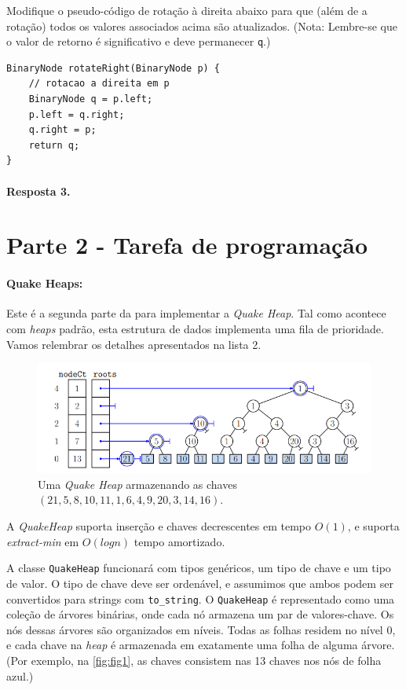 \documentclass{article}
\begin{document}
Modifique o pseudo-código de rotação à direita abaixo para que (além de
a rotação) todos os valores associados acima são atualizados. (Nota: Lembre-se que o
valor de retorno é significativo e deve permanecer \texttt{q}.)
\begin{lstlisting}
BinaryNode rotateRight(BinaryNode p) { 
    // rotacao a direita em p
    BinaryNode q = p.left;
    p.left = q.right;
    q.right = p;
    return q;
}
\end{lstlisting}

\paragraph{Resposta 3.}

\section*{Parte 2 - Tarefa de programação}

\paragraph{Quake Heaps:}

Este é a segunda parte da para implementar a \textit{Quake Heap}. Tal como acontece com \textit{heaps} padrão, esta estrutura de dados implementa uma fila de prioridade. Vamos relembrar os detalhes apresentados na lista 2.


\begin{figure}[!h]
    \centering
    \includegraphics[width = 0.8\linewidth]{figures/fig1.png}
    \caption{Uma \textit{Quake Heap} armazenando as chaves $(21, 5, 8, 10, 11, 1, 6, 4, 9, 20, 3, 14, 16)$.}
    \label{fig:fig1}
\end{figure}

A \textit{QuakeHeap} suporta inserção e chaves decrescentes em tempo $O(1)$, e suporta \textit{extract-min} em $O(log n)$ tempo amortizado. 

A classe \texttt{QuakeHeap} funcionará com tipos genéricos, um tipo de chave
e um tipo de valor. O tipo de chave deve ser ordenável, e assumimos que ambos podem ser convertidos para strings com \texttt{to\_string}. 
O \texttt{QuakeHeap}  é representado como uma coleção de árvores binárias, onde cada nó armazena um par de valores-chave. Os nós dessas árvores são organizados em níveis. Todas as folhas residem no nível 0, e cada chave na \textit{heap} é armazenada em exatamente uma folha de alguma árvore. (Por exemplo, na \autoref{fig:fig1},
as chaves consistem nas 13 chaves nos nós de folha azul.)
\end{document}
